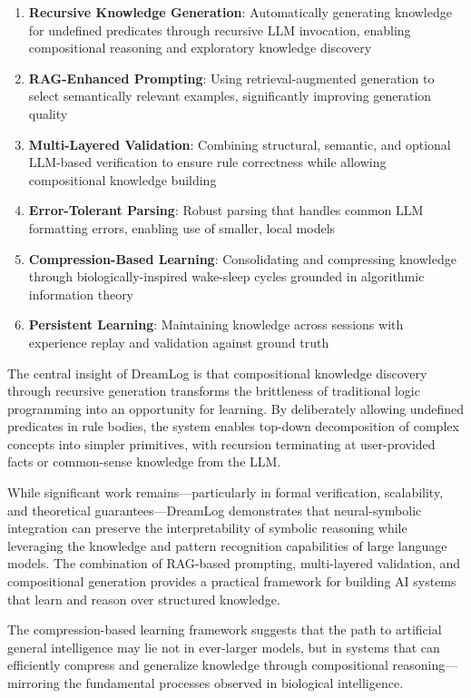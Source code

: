 \documentclass[10pt,conference]{IEEEtran}
\begin{document}
\begin{enumerate}
\item \textbf{Recursive Knowledge Generation}: Automatically generating knowledge for undefined predicates through recursive LLM invocation, enabling compositional reasoning and exploratory knowledge discovery
\item \textbf{RAG-Enhanced Prompting}: Using retrieval-augmented generation to select semantically relevant examples, significantly improving generation quality
\item \textbf{Multi-Layered Validation}: Combining structural, semantic, and optional LLM-based verification to ensure rule correctness while allowing compositional knowledge building
\item \textbf{Error-Tolerant Parsing}: Robust parsing that handles common LLM formatting errors, enabling use of smaller, local models
\item \textbf{Compression-Based Learning}: Consolidating and compressing knowledge through biologically-inspired wake-sleep cycles grounded in algorithmic information theory
\item \textbf{Persistent Learning}: Maintaining knowledge across sessions with experience replay and validation against ground truth
\end{enumerate}

The central insight of DreamLog is that compositional knowledge discovery through recursive generation transforms the brittleness of traditional logic programming into an opportunity for learning. By deliberately allowing undefined predicates in rule bodies, the system enables top-down decomposition of complex concepts into simpler primitives, with recursion terminating at user-provided facts or common-sense knowledge from the LLM.

While significant work remains—particularly in formal verification, scalability, and theoretical guarantees—DreamLog demonstrates that neural-symbolic integration can preserve the interpretability of symbolic reasoning while leveraging the knowledge and pattern recognition capabilities of large language models. The combination of RAG-based prompting, multi-layered validation, and compositional generation provides a practical framework for building AI systems that learn and reason over structured knowledge.

The compression-based learning framework suggests that the path to artificial general intelligence may lie not in ever-larger models, but in systems that can efficiently compress and generalize knowledge through compositional reasoning—mirroring the fundamental processes observed in biological intelligence.
\end{document}
